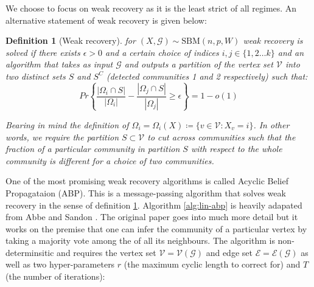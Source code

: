 \documentclass[]{article}
\newcommand{\Gcal}{\mathcal{G}}
\newcommand{\Vcal}{\mathcal{V}}
\newcommand{\Ecal}{\mathcal{E}}
\newtheorem{definition}{Definition}[section]
\begin{document}
We choose to focus on weak recovery as it is the least strict of all regimes. An alternative statement of weak recovery is given below:

\begin{definition}[Weak recovery]
	\label{defn:weak-recovery}
	for  $(X, \Gcal) \sim \textrm{SBM}(n, p, W)$ weak recovery is solved if there exists $\epsilon > 0$ and a certain choice of indices $i, j \in \{1, 2 \dots k\}$ and an algorithm that takes as input $\Gcal$ and outputs a partition of the vertex set $\Vcal$ into two distinct sets $S$ and $S^C$ (detected communities 1 and 2 respectively) such that:
	\begin{equation*}
		Pr\left\{ \frac{|\Omega_i \cap S|}{|\Omega_i|} - \frac{|\Omega_j \cap S|}{|\Omega_j|} \geq \epsilon \right\} = 1 - o(1)
	\end{equation*}

	Bearing in mind the definition of $\Omega_i = \Omega_i(X) \coloneqq \{v \in \Vcal : X_v = i\}$. In other words, we require the partition $S \subset \Vcal$ to cut across communities such that the fraction of a particular community in partition $S$ with respect to the whole community is different for a choice of two communities.  
\end{definition}


One of the most promising weak recovery algorithms is called Acyclic Belief Propagataion (ABP). This is a message-passing algorithm that solves weak recovery in the sense of definition \ref{defn:weak-recovery}. Algorithm \ref{alg:lin-abp} is heavily adapated from Abbe and Sandon \cite{Linear-ABP}. The original paper goes into much more detail but it works on the premise that one can infer the community of a particular vertex by taking a majority vote among the  of all its neighbours. The algorithm is non-determinsitic and requires the vertex set $\Vcal = \Vcal(\Gcal)$ and edge set $\Ecal = \Ecal(\Gcal)$ as well as two hyper-parameters $r$ (the maximum cyclic length to correct for) and $T$ (the number of iterations):
\end{document}
